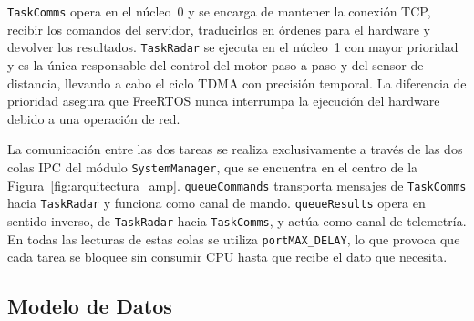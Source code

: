 \begin{table}[H]
\centering
{}
\caption{Configuración de tareas FreeRTOS del nodo sensor.}
\label{tab:freertos_tasks}
\end{table}


\texttt{TaskComms} opera en el núcleo~0 y se encarga de mantener la conexión TCP, recibir los comandos del servidor, traducirlos en órdenes para el hardware y devolver los resultados. \texttt{TaskRadar} se ejecuta en el núcleo~1 con mayor prioridad y es la única responsable del control del motor paso a paso y del sensor de distancia, llevando a cabo el ciclo TDMA con precisión temporal. La diferencia de prioridad asegura que FreeRTOS nunca interrumpa la ejecución del hardware debido a una operación de red.

La comunicación entre las dos tareas se realiza exclusivamente a través de las dos colas IPC del módulo \texttt{SystemManager}, que se encuentra en el centro de la Figura~\ref{fig:arquitectura_amp}. \texttt{queueCommands} transporta mensajes de \texttt{TaskComms} hacia \texttt{TaskRadar} y funciona como canal de mando. \texttt{queueResults} opera en sentido inverso, de \texttt{TaskRadar} hacia \texttt{TaskComms}, y actúa como canal de telemetría. En todas las lecturas de estas colas se utiliza \texttt{portMAX\_DELAY}, lo que provoca que cada tarea se bloquee sin consumir CPU hasta que recibe el dato que necesita.

\subsection{Modelo de Datos}

